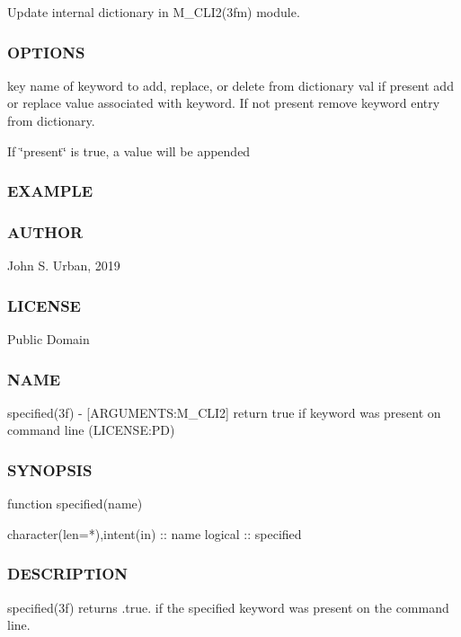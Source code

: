 Update internal dictionary in M\+\_\+\+C\+L\+I2(3fm) module. \subsubsection*{O\+P\+T\+I\+O\+NS}

key name of keyword to add, replace, or delete from dictionary val if present add or replace value associated with keyword. If not present remove keyword entry from dictionary.

If \char`\"{}present\char`\"{} is true, a value will be appended \subsubsection*{E\+X\+A\+M\+P\+LE}

\subsubsection*{A\+U\+T\+H\+OR}

John S. Urban, 2019 \subsubsection*{L\+I\+C\+E\+N\+SE}

Public Domain \subsubsection*{N\+A\+ME}

specified(3f) -\/ \mbox{[}A\+R\+G\+U\+M\+E\+N\+TS\+:M\+\_\+\+C\+L\+I2\mbox{]} return true if keyword was present on command line (L\+I\+C\+E\+N\+SE\+:PD)

\subsubsection*{S\+Y\+N\+O\+P\+S\+IS}

\begin{DoxyVerb}function specified(name)

 character(len=*),intent(in) :: name
 logical :: specified
\end{DoxyVerb}


\subsubsection*{D\+E\+S\+C\+R\+I\+P\+T\+I\+ON}

\begin{DoxyVerb}specified(3f) returns .true. if the specified keyword was present on
the command line.
\end{DoxyVerb}


